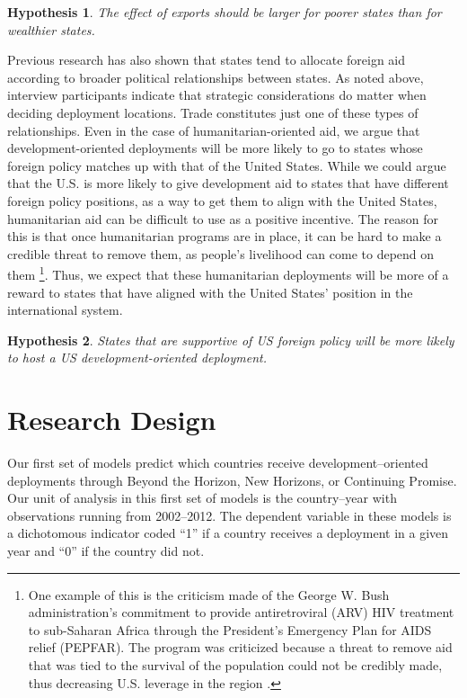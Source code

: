 \documentclass[12pt]{article}
\newtheorem{hyp}{Hypothesis}
\begin{document}
\begin{doublespace}
\begin{hyp}
     The effect of exports should be larger for poorer states than for wealthier states.
\end{hyp}

Previous research has also shown that states tend to allocate foreign aid according to broader political relationships between states. As noted above, interview participants indicate that strategic considerations do matter when deciding deployment locations. Trade constitutes just one of these types of relationships. Even in the case of humanitarian-oriented aid, we argue that development-oriented deployments will be more likely to go to states whose foreign policy matches up with that of the United States.  While we could argue that the U.S. is more likely to give development aid to states that have different foreign policy positions, as a way to get them to align with the United States, humanitarian aid can be difficult to use as a positive incentive.  The reason for this is that once humanitarian programs are in place, it can be hard to make a credible threat to remove them, as people's livelihood can come to depend on them \cite{lyman2010no}\footnote{One example of this is the criticism made of the George W. Bush administration's commitment to provide antiretroviral (ARV) HIV treatment to sub-Saharan Africa through the President's Emergency Plan for AIDS relief (PEPFAR).  The program was criticized because a threat to remove aid that was tied to the survival of the population could not be credibly made, thus decreasing U.S. leverage in the region \cite{lyman2010no}. }.  Thus, we expect that these humanitarian deployments will be more of a reward to states that have aligned with the United States' position in the international system.     

\begin{hyp}
States that are supportive of US foreign policy will be more likely to host a US development-oriented deployment.
\end{hyp}






\section{Research Design}

Our first set of models predict which countries receive development--oriented deployments through Beyond the Horizon, New Horizons, or Continuing Promise. Our unit of analysis in this first set of models is the country--year with observations running from 2002--2012. The dependent variable in these models is a dichotomous indicator coded ``1'' if a country receives a deployment in a given year and ``0'' if the country did not. 


\end{doublespace}
\end{document}
